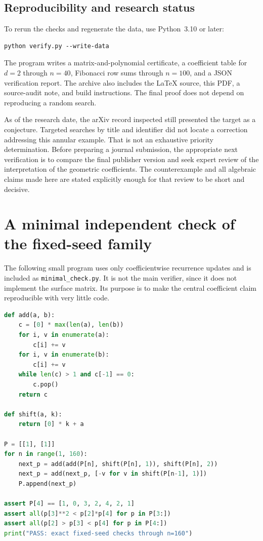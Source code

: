 \documentclass[11pt,letterpaper]{article}
\numberwithin{equation}{section}
\theoremstyle{definition}
\begin{document}
\subsection{Reproducibility and research status}

To rerun the checks and regenerate the data, use Python~3.10 or later:
\begin{lstlisting}
python verify.py --write-data
\end{lstlisting}
The program writes a matrix-and-polynomial certificate, a coefficient table
for $d=2$ through $n=40$, Fibonacci row sums through $n=100$, and a JSON
verification report. The archive also includes the LaTeX source, this PDF,
a source-audit note, and build instructions. The final proof does not depend
on reproducing a random search.

As of the research date, the arXiv record inspected still presented the target
as a conjecture. Targeted searches by title and identifier did not locate a
correction addressing this annular example. That is not an exhaustive
priority determination. Before preparing a journal submission, the appropriate
next verification is to compare the final publisher version and seek expert
review of the interpretation of the geometric coefficients. The counterexample
and all algebraic claims made here are stated explicitly enough for that
review to be short and decisive.

\appendix
\section{A minimal independent check of the fixed-seed family}\label{app:minimal}

The following small program uses only coefficientwise recurrence updates and
is included as \texttt{minimal\_check.py}. It is not the main verifier, since
it does not implement the surface matrix. Its purpose is to make the central
coefficient claim reproducible with very little code.
\begin{lstlisting}[language=Python]
def add(a, b):
    c = [0] * max(len(a), len(b))
    for i, v in enumerate(a):
        c[i] += v
    for i, v in enumerate(b):
        c[i] += v
    while len(c) > 1 and c[-1] == 0:
        c.pop()
    return c

def shift(a, k):
    return [0] * k + a

P = [[1], [1]]
for n in range(1, 160):
    next_p = add(add(P[n], shift(P[n], 1)), shift(P[n], 2))
    next_p = add(next_p, [-v for v in shift(P[n-1], 1)])
    P.append(next_p)

assert P[4] == [1, 0, 3, 2, 4, 2, 1]
assert all(p[3]**2 < p[2]*p[4] for p in P[3:])
assert all(p[2] > p[3] < p[4] for p in P[4:])
print("PASS: exact fixed-seed checks through n=160")
\end{lstlisting}
\end{document}
